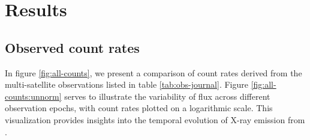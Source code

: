 \section{Results}

    \subsection{Observed count rates}
    In figure \ref{fig:all-counts}, we present a comparison of count rates derived from the multi-satellite observations listed in table \ref{tab:obs-journal}. Figure \ref{fig:all-counts:unnorm} serves to illustrate the variability of flux across different observation epochs, with count rates plotted on a logarithmic scale. This visualization provides insights into the temporal evolution of X-ray emission from \source.

